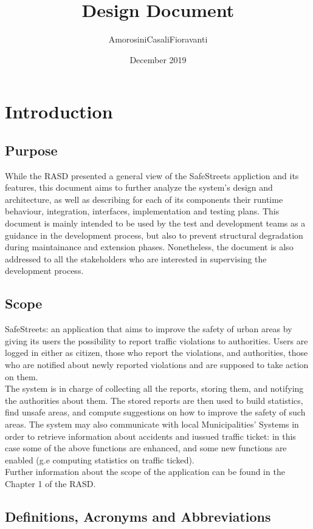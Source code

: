 \documentclass{report}
\title{Design Document}
\author{AmorosiniCasaliFioravanti}
\date{December 2019}
\begin{document}


\tableofcontents

\chapter{Introduction}
\section{Purpose}
While the RASD presented a general view of the SafeStreets appliction and its features, this document aims to further analyze the system's design and architecture, as well as describing for each of its components their runtime behaviour, integration, interfaces, implementation and testing plans.
This document is mainly intended to be used by the test and development teams as a guidance in the development process, but also to prevent structural degradation during maintainance and extension phases. Nonetheless, the document is also addressed to all the stakeholders who are interested in supervising the development process.

\section{Scope}
SafeStreets: an application that aims to improve the safety of urban areas by giving its users the possibility to report traffic violations to authorities. Users are logged in either as citizen, those who report the violations, and authorities, those who are notified about newly reported violations and are supposed to take action on them.\\
The system is in charge of collecting all the reports, storing them, and notifying the authorities about them. The stored reports are then used to build statistics, find unsafe areas, and compute suggestions on how to improve the safety of such areas. The system may also communicate with local Municipalities' Systems in order to retrieve information about accidents and iussued traffic ticket: in this case some of the above functions are enhanced, and some new functions are enabled (g.e computing statistics on traffic ticked).\\
\newline
Further information about the scope of the application can be found in the Chapter 1 of the RASD.

\section{Definitions, Acronyms and Abbreviations}
\end{document}
